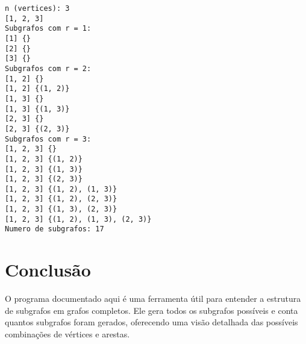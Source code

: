 \documentclass[a4paper,12pt]{article}
\begin{document}
\begin{verbatim}
n (vertices): 3
[1, 2, 3]
Subgrafos com r = 1:
[1] {}
[2] {}
[3] {}
Subgrafos com r = 2:
[1, 2] {}
[1, 2] {(1, 2)}
[1, 3] {}
[1, 3] {(1, 3)}
[2, 3] {}
[2, 3] {(2, 3)}
Subgrafos com r = 3:
[1, 2, 3] {}
[1, 2, 3] {(1, 2)}
[1, 2, 3] {(1, 3)}
[1, 2, 3] {(2, 3)}
[1, 2, 3] {(1, 2), (1, 3)}
[1, 2, 3] {(1, 2), (2, 3)}
[1, 2, 3] {(1, 3), (2, 3)}
[1, 2, 3] {(1, 2), (1, 3), (2, 3)}
Numero de subgrafos: 17
\end{verbatim}

\section{Conclusão}

O programa documentado aqui é uma ferramenta útil para entender a estrutura de subgrafos em grafos completos. Ele gera todos os subgrafos possíveis e conta quantos subgrafos foram gerados, oferecendo uma visão detalhada das possíveis combinações de vértices e arestas.
\end{document}
